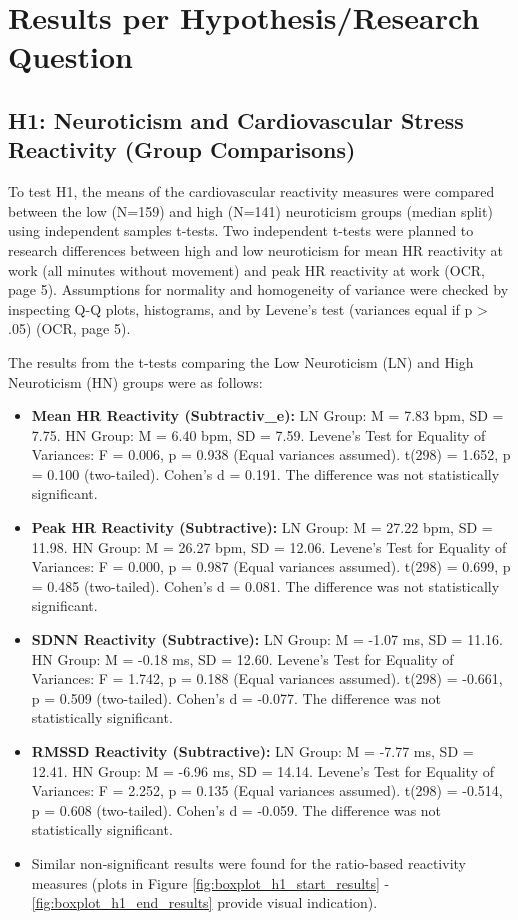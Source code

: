 \documentclass[11pt, a4paper]{report}
\begin{document}
\section{Results per Hypothesis/Research Question}
\label{sec:results_hypotheses_question} %

\subsection{H1: Neuroticism and Cardiovascular Stress Reactivity (Group Comparisons)}
\label{subsec:results_h1_group_comp} %
To test H1, the means of the cardiovascular reactivity measures were compared between the low (N=159) and high (N=141) neuroticism groups (median split) using independent samples t-tests. Two independent t-tests were planned to research differences between high and low neuroticism for mean HR reactivity at work (all minutes without movement) and peak HR reactivity at work \cite{ThesisTempPDF} (OCR, page 5). Assumptions for normality and homogeneity of variance were checked by inspecting Q-Q plots, histograms, and by Levene's test (variances equal if p > .05) \cite{ThesisTempPDF} (OCR, page 5).

The results from the t-tests comparing the Low Neuroticism (LN) and High Neuroticism (HN) groups were as follows:
\begin{itemize}
    \item \textbf{Mean HR Reactivity (Subtractiv_e):}
        LN Group: M = 7.83 bpm, SD = 7.75. HN Group: M = 6.40 bpm, SD = 7.59.
        Levene's Test for Equality of Variances: F = 0.006, p = 0.938 (Equal variances assumed).
        t(298) = 1.652, p = 0.100 (two-tailed). Cohen's d = 0.191.
        The difference was not statistically significant.
    \item \textbf{Peak HR Reactivity (Subtractive):}
        LN Group: M = 27.22 bpm, SD = 11.98. HN Group: M = 26.27 bpm, SD = 12.06.
        Levene's Test for Equality of Variances: F = 0.000, p = 0.987 (Equal variances assumed).
        t(298) = 0.699, p = 0.485 (two-tailed). Cohen's d = 0.081.
        The difference was not statistically significant.
    \item \textbf{SDNN Reactivity (Subtractive):}
        LN Group: M = -1.07 ms, SD = 11.16. HN Group: M = -0.18 ms, SD = 12.60.
        Levene's Test for Equality of Variances: F = 1.742, p = 0.188 (Equal variances assumed).
        t(298) = -0.661, p = 0.509 (two-tailed). Cohen's d = -0.077.
        The difference was not statistically significant.
    \item \textbf{RMSSD Reactivity (Subtractive):}
        LN Group: M = -7.77 ms, SD = 12.41. HN Group: M = -6.96 ms, SD = 14.14.
        Levene's Test for Equality of Variances: F = 2.252, p = 0.135 (Equal variances assumed).
        t(298) = -0.514, p = 0.608 (two-tailed). Cohen's d = -0.059.
        The difference was not statistically significant.
    \item Similar non-significant results were found for the ratio-based reactivity measures (plots in Figure \ref{fig:boxplot_h1_start_results} - \ref{fig:boxplot_h1_end_results} provide visual indication).
\end{itemize}
\end{document}
